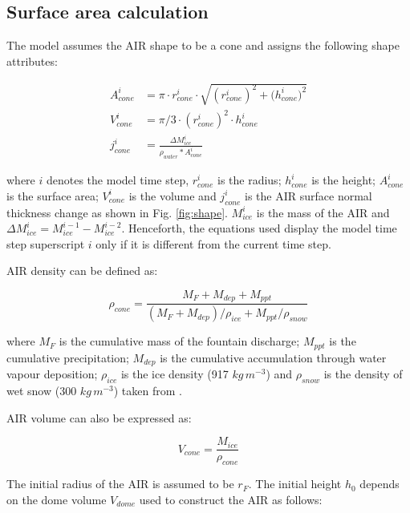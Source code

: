 \subsection{Surface area calculation} \label{sec:shape}

The model assumes the AIR shape to be a cone and assigns the following shape attributes:

\begin{subequations}
	\begin{align}
		\label{eq:A}
		A_{cone}^i & = \pi \cdot r_{cone}^i \cdot \sqrt{{(r_{cone}^i)}^2 + {(h_{cone}^i})^ 2} \\
		\label{eq:V}
		V_{cone}^i & = \pi/3 \cdot {(r_{cone}^i)}^2 \cdot h_{cone}^i                          \\
		\label{eq:thickness}
		j_{cone}^i & =\frac{\Delta M_{ice}^i}{\rho_{water}* A_{cone}^i}
	\end{align}
\end{subequations}

where $i$ denotes the model time step, $r_{cone}^i$ is the radius; $h_{cone}^i$ is the height; $A_{cone}^i$ is
the surface area; $V_{cone}^i$ is the volume and $j_{cone}^i$ is the AIR surface normal thickness change as shown
in Fig. \ref{fig:shape}. $M_{ice}^i$ is the mass of the AIR and $\Delta M_{ice}^i = M_{ice}^{i-1} -
	M_{ice}^{i-2}$. Henceforth, the equations used display the model time step superscript $i$ only if it is different
from the current time step.

AIR density can be defined as:

\begin{equation}
	\rho_{cone} = \frac{M_{F} + M_{dep} + M_{ppt}}{(M_{F} + M_{dep})/\rho_{ice} + M_{ppt}/\rho_{snow}}
\end{equation}

where $M_F$ is the cumulative mass of the fountain discharge; $M_{ppt}$ is the cumulative precipitation;
$M_{dep}$ is the cumulative accumulation through water vapour deposition; $\rho_{ice}$ is the ice density (917
$kg\,m^{-3}$) and $\rho_{snow}$ is the density of wet snow (300 $kg\,m^{-3}$) taken from
\cite{cuffeyPhysicsGlaciers2010} .

AIR volume can also be expressed as:

\begin{equation} V_{cone} =\frac{M_{ice}} {\rho_{cone}} \label{eq:V1} \end{equation}

The initial radius of the AIR is assumed to be $r_F$. The initial height $h_0$ depends on the dome volume
$V_{dome}$ used to construct the AIR as follows:

